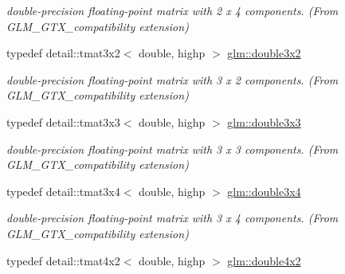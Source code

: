 \begin{CompactItemize}
\begin{CompactList}\small\item\em double-precision floating-point matrix with 2 x 4 components. (From GLM\_\-GTX\_\-compatibility extension) \item\end{CompactList}\item 
\hypertarget{group__gtx__compatibility_g1f70107ac850f512ac4e09737e1f85b7}{
typedef detail::tmat3x2$<$ double, highp $>$ \hyperlink{group__gtx__compatibility_g1f70107ac850f512ac4e09737e1f85b7}{glm::double3x2}}
\label{group__gtx__compatibility_g1f70107ac850f512ac4e09737e1f85b7}

\begin{CompactList}\small\item\em double-precision floating-point matrix with 3 x 2 components. (From GLM\_\-GTX\_\-compatibility extension) \item\end{CompactList}\item 
\hypertarget{group__gtx__compatibility_g2b56fa7536ae728c64fde99d6618139a}{
typedef detail::tmat3x3$<$ double, highp $>$ \hyperlink{group__gtx__compatibility_g2b56fa7536ae728c64fde99d6618139a}{glm::double3x3}}
\label{group__gtx__compatibility_g2b56fa7536ae728c64fde99d6618139a}

\begin{CompactList}\small\item\em double-precision floating-point matrix with 3 x 3 components. (From GLM\_\-GTX\_\-compatibility extension) \item\end{CompactList}\item 
\hypertarget{group__gtx__compatibility_gb38107892c0116610e7de83126aff405}{
typedef detail::tmat3x4$<$ double, highp $>$ \hyperlink{group__gtx__compatibility_gb38107892c0116610e7de83126aff405}{glm::double3x4}}
\label{group__gtx__compatibility_gb38107892c0116610e7de83126aff405}

\begin{CompactList}\small\item\em double-precision floating-point matrix with 3 x 4 components. (From GLM\_\-GTX\_\-compatibility extension) \item\end{CompactList}\item 
\hypertarget{group__gtx__compatibility_g816d1a516a5ec13511fe1ae703ddcf94}{
typedef detail::tmat4x2$<$ double, highp $>$ \hyperlink{group__gtx__compatibility_g816d1a516a5ec13511fe1ae703ddcf94}{glm::double4x2}}
\label{group__gtx__compatibility_g816d1a516a5ec13511fe1ae703ddcf94}


\end{CompactItemize}
